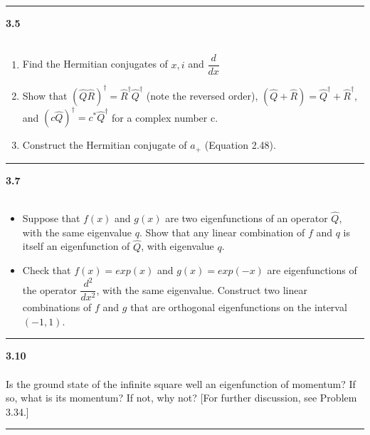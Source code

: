 \documentclass[fleqn]{article}
\begin{document}
  \rule{15cm}{1pt}

  \textbf{3.5} \\ \\
  \begin{enumerate}
    \item Find the Hermitian conjugates of $x, i$ and $\dfrac{d}{dx}$

    \item Show that $(\hat{Q} \hat{R})^{\dagger}=\hat{R}^{\dagger} \hat{Q}^{\dagger}$ 
    (note the reversed order), $(\hat{Q}+\hat{R})=\hat{Q}^{\dagger}+\hat{R}^{\dagger}$, and 
    $(c \hat{Q})^{\dagger}=c^* \hat{Q}^{\dagger}$ for a complex number c.


    \item Construct the Hermitian conjugate of $a_+$ (Equation 2.48).
  \end{enumerate}

  \rule{15cm}{1pt}

  \textbf{3.7} \\ \\
  \begin{itemize}
    \item Suppose that $f(x)$ and $g(x)$ are two eigenfunctions of an operator $\hat{Q}$,
    with the same eigenvalue $q$. Show that any linear combination of $f$ and $q$ is
    itself an eigenfunction of $\hat{Q}$, with eigenvalue $q$.


    \item Check that $f(x)=exp(x)$ and $g(x)=exp(-x)$ are eigenfunctions of
    the operator $\dfrac{d^2}{dx^2}$, with the same eigenvalue. Construct two linear
    combinations of $f$ and $g$ that are orthogonal eigenfunctions on the interval $(-1,1)$.
    
  \end{itemize}


  \rule{15cm}{1pt}

  \textbf{3.10} \\ \\
  Is the ground state of the infinite square well an eigenfunction of
  momentum? If so, what is its momentum? If not, why not? [For further
  discussion, see Problem 3.34.]


  \rule{15cm}{1pt}
\end{document}
